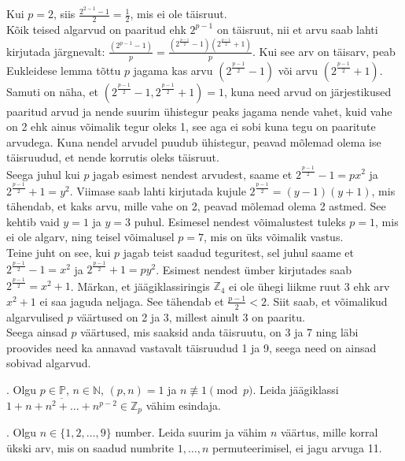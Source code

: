 \documentclass[a4paper, 10pt]{article}
\newcommand{\Z}{\mathbb{Z}}
\newcommand{\N}{\mathbb{N}}
\newcommand{\B}{\mathbb{P}}
\begin{document}
\bigskip
Kui $p=2$, siis $\frac{2^{2-1}-1}{2}=\frac12$, mis ei ole täisruut.\\
Kõik teised algarvud on paaritud ehk $2^{p-1}$ on täisruut, nii et arvu saab lahti kirjutada järgnevalt: $\frac{(2^{p-1}-1)}{p}=\frac{(2^{\frac{p-1}2}-1)(2^{\frac{p-1}2}+1)}{p}$. Kui see arv on täisarv, peab Eukleidese lemma tõttu $p$ jagama kas arvu $(2^{\frac{p-1}2}-1)$ või arvu $(2^{\frac{p-1}2}+1)$. Samuti on näha, et $(2^{\frac{p-1}2}-1,2^{\frac{p-1}2}+1)=1$, kuna need arvud on järjestikused paaritud arvud ja nende suurim ühistegur peaks jagama nende vahet, kuid vahe on 2 ehk ainus võimalik tegur oleks 1, see aga ei sobi kuna tegu on paaritute arvudega. Kuna nendel arvudel puudub ühistegur, peavad mõlemad olema ise täisruudud, et nende korrutis oleks täisruut.\\
Seega juhul kui $p$ jagab esimest nendest arvudest, saame et $2^{\frac{p-1}2}-1=px^2$ ja $2^{\frac{p-1}2}+1=y^2$. Viimase saab lahti kirjutada kujule $2^{\frac{p-1}2}=(y-1)(y+1)$, mis tähendab, et kaks arvu, mille vahe on 2, peavad mõlemad olema 2 astmed. See kehtib vaid $y=1$ ja $y=3$ puhul. Esimesel nendest võimalustest tuleks $p=1$, mis ei ole algarv, ning teisel võimalusel $p=7$, mis on üks võimalik vastus.\\
Teine juht on see, kui $p$ jagab teist saadud teguritest, sel juhul saame et $2^{\frac{p-1}2}-1=x^2$ ja $2^{\frac{p-1}2}+1=py^2$. Esimest nendest ümber kirjutades saab $2^{\frac{p-1}2}=x^2+1$. Märkan, et jäägiklassiringis $\Z_4$ ei ole ühegi liikme ruut 3 ehk arv $x^2+1$ ei saa jaguda neljaga. See tähendab et $\frac{p-1}2<2$. Siit saab, et võimalikud algarvulised $p$ väärtused on 2 ja 3, millest ainult 3 on paaritu.\\
Seega ainsad $p$ väärtused, mis saaksid anda täisruutu, on 3 ja 7 ning läbi proovides need ka annavad vastavalt täisruudud 1 ja 9, seega need on ainsad sobivad algarvud.
\bigskip

. Olgu $p\in\B$, $n\in\N$, $(p,n)=1$ ja $n\not\equiv 1\pmod{p}$. Leida jäägiklassi $\overline{1+n+n^2+\ldots+n^{p-2}}\in\Z_p$ vähim esindaja. 

\bigskip

. Olgu $n\in\{1,2,\ldots,9\}$ number. Leida suurim ja vähim $n$ väärtus, mille korral ükski arv, mis on saadud numbrite $1,\ldots,n$ permuteerimisel, ei jagu arvuga 11. 
\end{document}
